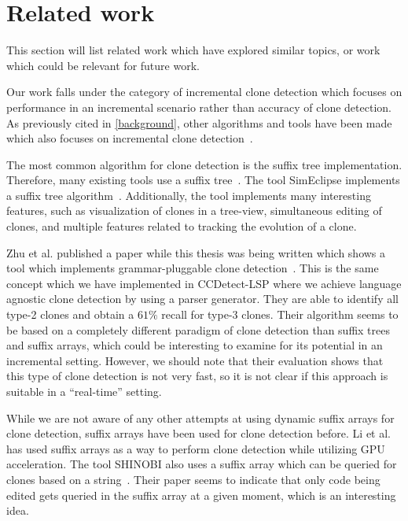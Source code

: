 \section{Related work}

This section will list related work which have explored similar topics, or work which
could be relevant for future work.

Our work falls under the category of incremental clone detection which focuses on
performance in an incremental scenario rather than accuracy of clone detection. As
previously cited in \cref{background}, other algorithms and tools have been made which
also focuses on incremental clone detection~\cite{GodeIncrementalCloneDetection,
LocalitySensitiveHashingIncremental, IndexBasedIncrementalCloneDetection,
SiameseScalableAndIncrementalClone}.

The most common algorithm for clone detection is the suffix tree implementation.
Therefore, many existing tools use a suffix tree~\cite{GodeIncrementalCloneDetection,
Zibran_real_time_search}. The tool SimEclipse implements a suffix tree
algorithm~\cite{Udding_Towards_Convenient_Management}. Additionally, the tool implements
many interesting features, such as visualization of clones in a tree-view, simultaneous
editing of clones, and multiple features related to tracking the evolution of a clone.

Zhu et al. published a paper while this thesis was being written which shows a tool which
implements grammar-pluggable clone detection~\cite{GrammarPluggableCloneDetection}. This
is the same concept which we have implemented in CCDetect-LSP where we achieve language
agnostic clone detection by using a parser generator. They are able to identify all type-2
clones and obtain a $61\%$ recall for type-3 clones. Their algorithm seems to be based on
a completely different paradigm of clone detection than suffix trees and suffix arrays,
which could be interesting to examine for its potential in an incremental setting.
However, we should note that their evaluation shows that this type of clone detection is
not very fast, so it is not clear if this approach is suitable in a ``real-time'' setting.

While we are not aware of any other attempts at using dynamic suffix arrays for clone
detection, suffix arrays have been used for clone detection before. Li et al.~\cite{SAGA}
has used suffix arrays as a way to perform clone detection while utilizing GPU
acceleration. The tool SHINOBI also uses a suffix array which can be queried for clones
based on a string~\cite{SHINOBI}. Their paper seems to indicate that only code being
edited gets queried in the suffix array at a given moment, which is an interesting idea.


